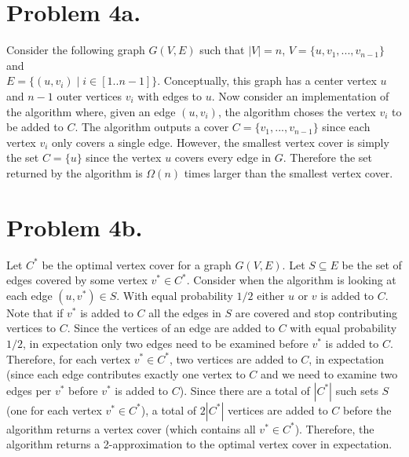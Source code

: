 \documentclass[12pt]{article}
\begin{document}
\pagestyle{plain}
\titleformat{\subsection}[runin]
  {\normalfont\large\bfseries}{\thesubsection}{1em}{}
\titleformat{\subsubsection}[runin]
  {\normalfont\large\bfseries}{\thesubsubsection}{1em}{}

\section*{Problem 4a.}
Consider the following graph $G(V,E)$ such that $|V| = n$,
$V = \{u, v_1, ..., v_{n-1}\}$ and \\
$E = \{(u,v_i) \mid i \in [1..n-1]\}$. Conceptually, this graph has a center
vertex $u$ and $n-1$ outer vertices $v_i$ with edges to $u$. Now consider an
implementation of the algorithm where, given an edge $(u,v_i)$, the algorithm
choses the vertex $v_i$ to be added to $C$. The algorithm outputs a cover
$C = \{v_1,...,v_{n-1}\}$ since each vertex $v_i$ only covers a single edge.
However, the smallest vertex cover is simply the set $C = \{u\}$ since the
vertex $u$ covers every edge in $G$. Therefore the set returned by the algorithm
is $\Omega(n)$ times larger than the smallest vertex cover.

\section*{Problem 4b.}
Let $C^*$ be the optimal vertex cover for a graph $G(V,E)$. Let
$S \subseteq E$ be the set of edges covered by some vertex $v^* \in C^*$.
Consider when the algorithm is looking at each edge $(u,v^*) \in S$. With equal
probability $1/2$ either $u$ or $v$ is added to $C$. Note that if $v^*$ is added
to $C$ all the edges in $S$ are covered and stop contributing vertices to $C$.
Since the vertices of an edge are added to $C$ with equal probability $1/2$, in
expectation only two edges need to be examined before $v^*$ is added to $C$.
Therefore, for each vertex $v^* \in C^*$, two vertices are added to $C$, in
expectation (since each edge contributes exactly one vertex to $C$ and we
need to examine two edges per $v^*$ before $v^*$ is added to $C$). Since there
are a total of $|C^*|$ such sets $S$ (one for each vertex $v^* \in C^*$), a total
of $2|C^*|$ vertices are added to $C$ before the algorithm returns a vertex cover
(which contains all $v^* \in C^*$). Therefore, the algorithm returns a
2-approximation to the optimal vertex cover in expectation.
\end{document}
